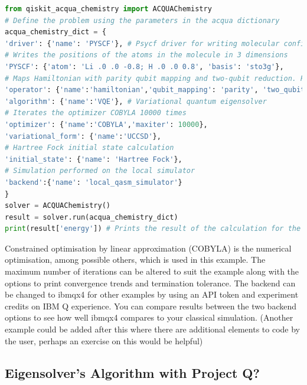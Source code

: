 \begin{lstlisting}[language=Python,float=h!,caption={The Lithium hydride eigensolver with Hartree Fock initial state adapted from \url{https://qiskit.org/acqua/chemistry}.}, label=acqua]
from qiskit_acqua_chemistry import ACQUAChemistry
# Define the problem using the parameters in the acqua dictionary
acqua_chemistry_dict = {
'driver': {'name': 'PYSCF'}, # Psycf driver for writing molecular configuration and species
# Writes the positions of the atoms in the molecule in 3 dimensions
'PYSCF': {'atom': 'Li .0 .0 -0.8; H .0 .0 0.8', 'basis': 'sto3g'},  
# Maps Hamiltonian with parity qubit mapping and two-qubit reduction. Reduces the orbital size as well 
'operator': {'name':'hamiltonian','qubit_mapping': 'parity', 'two_qubit_reduction': True, 'freeze_core': True, 'orbital_reduction': [-3,-2]},
'algorithm': {'name':'VQE'}, # Variational quantum eigensolver
# Iterates the optimizer COBYLA 10000 times
'optimizer': {'name':'COBYLA','maxiter': 10000},
'variational_form': {'name':'UCCSD'}, 
# Hartree Fock initial state calculation
'initial_state': {'name': 'Hartree Fock'}, 
# Simulation performed on the local simulator
'backend':{'name': 'local_qasm_simulator'} 
}
solver = ACQUAChemistry()
result = solver.run(acqua_chemistry_dict)
print(result['energy']) # Prints the result of the calculation for the ground state energy
\end{lstlisting}
Constrained optimisation by linear approximation (COBYLA) is the numerical optimisation, among possible others, which is used in this example. The maximum number of iterations can be altered to suit the example along with the options to print convergence trends and termination tolerance. The backend can be changed to ibmqx4 for other examples by using an API token and experiment credits on IBM Q experience. You can compare results between the two backend options to see how well ibmqx4 compares to your classical simulation. (Another example could be added after this where there are additional elements to code by the user, perhaps an exercise on this would be helpful)
\newpage

\subsection{Eigensolver's Algorithm with Project Q?}



